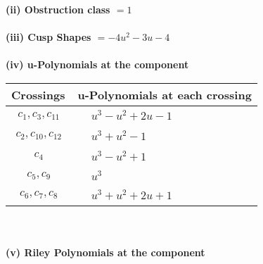 \documentclass[1p]{elsarticle_modified}
\theoremstyle{definition}
\begin{document}
\flushleft \textbf{(ii) Obstruction class $= 1$}\\~\\
\flushleft \textbf{(iii) Cusp Shapes $= -4 u^2-3 u-4$}\\~\\
\newpage\renewcommand{\arraystretch}{1}
\flushleft \textbf{(iv) u-Polynomials at the component}\newline \\
\begin{tabular}{m{50pt}|m{274pt}}
Crossings & \hspace{64pt}u-Polynomials at each crossing \\
\hline $$\begin{aligned}c_{1},c_{3},c_{11}\end{aligned}$$&$\begin{aligned}
&u^3- u^2+2 u-1
\end{aligned}$\\
\hline $$\begin{aligned}c_{2},c_{10},c_{12}\end{aligned}$$&$\begin{aligned}
&u^3+u^2-1
\end{aligned}$\\
\hline $$\begin{aligned}c_{4}\end{aligned}$$&$\begin{aligned}
&u^3- u^2+1
\end{aligned}$\\
\hline $$\begin{aligned}c_{5},c_{9}\end{aligned}$$&$\begin{aligned}
&u^3
\end{aligned}$\\
\hline $$\begin{aligned}c_{6},c_{7},c_{8}\end{aligned}$$&$\begin{aligned}
&u^3+u^2+2 u+1
\end{aligned}$\\
\hline
\end{tabular}\\~\\
\newpage\renewcommand{\arraystretch}{1}
\flushleft \textbf{(v) Riley Polynomials at the component}\newline \\
\end{document}
